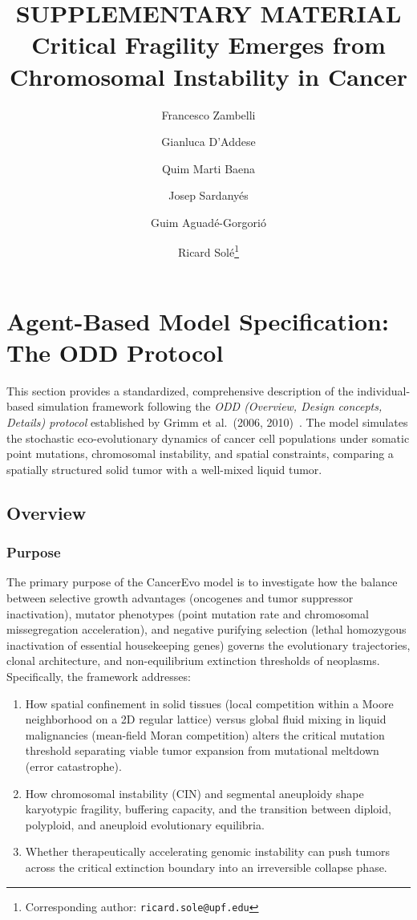 \documentclass[11pt,a4paper]{article}
\title{SUPPLEMENTARY MATERIAL\\[1ex]
\Large Critical Fragility Emerges from \\Chromosomal Instability in Cancer}
\author[1,2]{Francesco Zambelli}
\author[2]{Gianluca D'Addese}
\author[3]{Quim Marti Baena}
\author[4]{Josep Sardany\'{e}s}
\author[5]{Guim Aguad\'{e}-Gorgori\'{o}}
\author[2,6,7,8]{Ricard Sol\'{e}\thanks{Corresponding author: \texttt{ricard.sole@upf.edu}}}
\affil[1]{\DFA}
\affil[2]{\CSL}
\affil[3]{\CRG}
\affil[4]{\CRM}
\affil[5]{\ISEM}
\affil[6]{\IBE}
\affil[7]{\ICREA}
\affil[8]{\SFI}
\begin{document}
\maketitle


\section{Agent-Based Model Specification: The ODD Protocol}
\label{sec:odd}

This section provides a standardized, comprehensive description of the individual-based simulation framework following the \textit{ODD (Overview, Design concepts, Details) protocol} established by Grimm et al.\ (2006, 2010)~\cite{grimm2006standard,grimm2010odd}. The model simulates the stochastic eco-evolutionary dynamics of cancer cell populations under somatic point mutations, chromosomal instability, and spatial constraints, comparing a spatially structured solid tumor with a well-mixed liquid tumor.

\subsection{Overview}

\subsubsection{Purpose}
The primary purpose of the CancerEvo model is to investigate how the balance between selective growth advantages (oncogenes and tumor suppressor inactivation), mutator phenotypes (point mutation rate and chromosomal missegregation acceleration), and negative purifying selection (lethal homozygous inactivation of essential housekeeping genes) governs the evolutionary trajectories, clonal architecture, and non-equilibrium extinction thresholds of neoplasms. Specifically, the framework addresses:
\begin{enumerate}
    \item How spatial confinement in solid tissues (local competition within a Moore neighborhood on a 2D regular lattice) versus global fluid mixing in liquid malignancies (mean-field Moran competition) alters the critical mutation threshold separating viable tumor expansion from mutational meltdown (error catastrophe).
    \item How chromosomal instability (CIN) and segmental aneuploidy shape karyotypic fragility, buffering capacity, and the transition between diploid, polyploid, and aneuploid evolutionary equilibria.
    \item Whether therapeutically accelerating genomic instability can push tumors across the critical extinction boundary into an irreversible collapse phase.
\end{enumerate}
\end{document}
